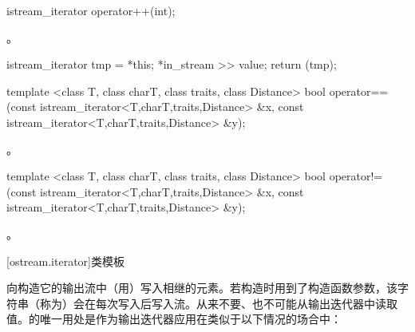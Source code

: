 %
%
\begin{itemdecl}
istream_iterator operator++(int);
\end{itemdecl}

\begin{itemdescr}
\pnum
\requires {}。

\pnum
\effects
\begin{codeblock}
istream_iterator tmp = *this;
*in_stream >> value;
return (tmp);
\end{codeblock}
\end{itemdescr}

%
%
\begin{itemdecl}
template <class T, class charT, class traits, class Distance>
  bool operator==(const istream_iterator<T,charT,traits,Distance> &x,
                  const istream_iterator<T,charT,traits,Distance> &y);
\end{itemdecl}

\begin{itemdescr}
\pnum
\returns
{}。
\end{itemdescr}

%
%
\begin{itemdecl}
template <class T, class charT, class traits, class Distance>
  bool operator!=(const istream_iterator<T,charT,traits,Distance> &x,
                  const istream_iterator<T,charT,traits,Distance> &y);
\end{itemdecl}

\begin{itemdescr}
\pnum
\returns
{}。
\end{itemdescr}

[ostream.iterator]{类模板}

\pnum
{}%
向构造它的输出流中（用）写入相继的元素。若构造时用到了构造函数参数，该字符串（称为）会在每次写入后写入流。从来不要、也不可能从输出迭代器中读取值。的唯一用处是作为输出迭代器应用在类似于以下情况的场合中：

